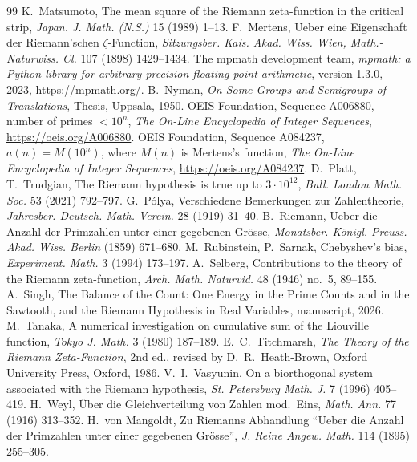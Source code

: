 \documentclass[11pt]{article}
\theoremstyle{definition}\newtheorem{definition}[theorem]{Definition}
\theoremstyle{remark}\newtheorem{remark}[theorem]{Remark}
\theoremstyle{definition}\newtheorem{axiom}{Axiom}
\begin{document}
\begin{thebibliography}{99}
 K.~Matsumoto, The mean square of the Riemann zeta-function in the critical strip, \emph{Japan. J. Math. (N.S.)} 15 (1989) 1--13.
 F.~Mertens, Ueber eine Eigenschaft der Riemann'schen $\zeta$-Function, \emph{Sitzungsber. Kais. Akad. Wiss. Wien, Math.-Naturwiss. Cl.} 107 (1898) 1429--1434.
 The mpmath development team, \emph{mpmath: a Python library for arbitrary-precision floating-point arithmetic}, version 1.3.0, 2023, \url{https://mpmath.org/}.
 B.~Nyman, \emph{On Some Groups and Semigroups of Translations}, Thesis, Uppsala, 1950.
 OEIS Foundation, Sequence A006880, number of primes $<10^n$, \emph{The On-Line Encyclopedia of Integer Sequences}, \url{https://oeis.org/A006880}.
 OEIS Foundation, Sequence A084237, $a(n)=M(10^n)$, where $M(n)$ is Mertens's function, \emph{The On-Line Encyclopedia of Integer Sequences}, \url{https://oeis.org/A084237}.
 D.~Platt, T.~Trudgian, The Riemann hypothesis is true up to $3\cdot10^{12}$, \emph{Bull. London Math. Soc.} 53 (2021) 792--797.
 G.~Pólya, Verschiedene Bemerkungen zur Zahlentheorie, \emph{Jahresber. Deutsch. Math.-Verein.} 28 (1919) 31--40.
 B.~Riemann, Ueber die Anzahl der Primzahlen unter einer gegebenen Grösse, \emph{Monatsber. Königl. Preuss. Akad. Wiss. Berlin} (1859) 671--680.
 M.~Rubinstein, P.~Sarnak, Chebyshev's bias, \emph{Experiment. Math.} 3 (1994) 173--197.
 A.~Selberg, Contributions to the theory of the Riemann zeta-function, \emph{Arch. Math. Naturvid.} 48 (1946) no.~5, 89--155.
 A.~Singh, The Balance of the Count: One Energy in the Prime Counts and in the Sawtooth, and the Riemann Hypothesis in Real Variables, manuscript, 2026.
 M.~Tanaka, A numerical investigation on cumulative sum of the Liouville function, \emph{Tokyo J. Math.} 3 (1980) 187--189.
 E.~C.~Titchmarsh, \emph{The Theory of the Riemann Zeta-Function}, 2nd ed., revised by D.~R.~Heath-Brown, Oxford University Press, Oxford, 1986.
 V.~I.~Vasyunin, On a biorthogonal system associated with the Riemann hypothesis, \emph{St. Petersburg Math. J.} 7 (1996) 405--419.
 H.~Weyl, Über die Gleichverteilung von Zahlen mod.~Eins, \emph{Math. Ann.} 77 (1916) 313--352.
 H.~von Mangoldt, Zu Riemanns Abhandlung ``Ueber die Anzahl der Primzahlen unter einer gegebenen Grösse'', \emph{J. Reine Angew. Math.} 114 (1895) 255--305.
\end{thebibliography}
\end{document}
